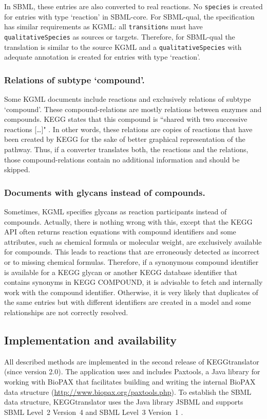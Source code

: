 \documentclass[10pt]{bmc_article}
\newenvironment{bmcformat}{\baselineskip20pt\sloppy\setboolean{publ}{false}}{\baselineskip20pt\sloppy}
\newcommand{\qualitativeSpecies}{\texttt{qualitative\-Species}}
\newcommand{\species}{\texttt{species}}
\newcommand{\transitions}{\texttt{transition}s}
\begin{document}
\begin{bmcformat}
In SBML, these entries are also converted to real reactions. No \species{} is created for entries with type `reaction' in SBML-core. For SBML-qual, the specification has similar requirements as KGML: all \transitions{} must have \qualitativeSpecies{} as sources or targets. Therefore, for SBML-qual the translation is similar to the source KGML and a \qualitativeSpecies{} with adequate annotation is created for entries with type `reaction'.

\subsubsection*{Relations of subtype `compound'.}
Some KGML documents include reactions and exclusively relations of subtype `compound'. These compound-relations are mostly relations between enzymes and compounds. KEGG states that this compound is ``shared with two successive reactions [\dots]" \cite{KGML}. In other words, these relations are copies of reactions that have been created by KEGG for the sake of better graphical representation of the pathway. Thus, if a converter translates both, the reactions and the relations, those compound-relations contain no additional information and should be skipped.

\subsubsection*{Documents with glycans instead of compounds.}
Sometimes, KGML specifies glycans as reaction participants instead of compounds. Actually, there is nothing wrong with this, except that the KEGG API often returns reaction equations with compound identifiers and some attributes, such as chemical formula or molecular weight, are exclusively available for compounds. This leads to reactions that are erroneously detected as incorrect or to missing chemical formulas. Therefore, if a synonymous compound identifier is available for a KEGG glycan or another KEGG database identifier that contains synonyms in KEGG COMPOUND, it is advisable to fetch and internally work with the compound identifier. Otherwise, it is very likely that duplicates of the same entries but with different identifiers are created in a model and some relationships are not correctly resolved.


\subsection*{Implementation and availability}
All described methods are implemented in the second release of KEGGtranslator (since version 2.0).
%
The application uses and includes Paxtools, a Java\texttrademark{} library for working with BioPAX that facilitates building and writing the internal BioPAX data structure (\url{http://www.biopax.org/paxtools.php}).
%
To establish the SBML data structure, KEGGtranslator uses the Java\texttrademark{} library JSBML \cite{JSBML} and supports SBML Level~2 Version~4 \cite{SBMLl2} and SBML Level~3 Version~1 \cite{SBMLl3}.


\end{bmcformat}
\end{document}
